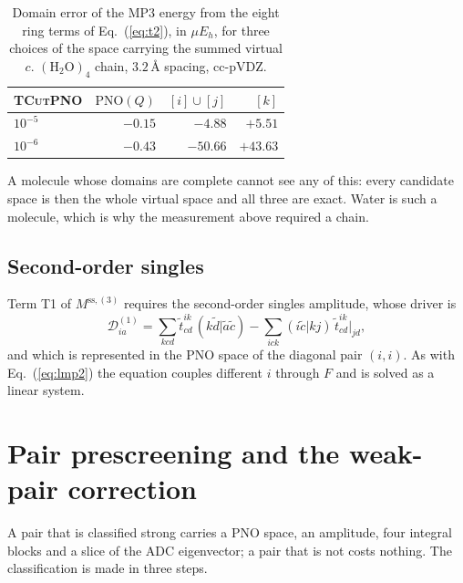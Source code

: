 \documentclass[aip,jcp,amsmath,amssymb,preprint,superscriptaddress]{revtex4-2}%
\newcommand{\pao}[1]{\tilde{#1}}
\newcommand{\TCut}[1]{\textsc{TCut#1}}
\begin{document}
\begin{table}
  \caption{Domain error of the MP3 energy from the eight ring terms of
    Eq.~(\ref{eq:t2}), in $\mu E_h$, for three choices of the space carrying
    the summed virtual $c$. $(\text{H}_2\text{O})_4$ chain,
    $3.2\,\text{\AA}$ spacing, cc-pVDZ.}
  \label{tab:ringspace}
  \begin{tabular}{lrrr}
    \hline\hline
    \TCut{PNO} & $\mathrm{PNO}(Q)$ & $[i]\cup[j]$ & $[k]$ \\
    \hline
    $10^{-5}$ & $-0.15$ & $-4.88$  & $+5.51$  \\
    $10^{-6}$ & $-0.43$ & $-50.66$ & $+43.63$ \\
    \hline\hline
  \end{tabular}
\end{table}

A molecule whose domains are complete cannot see any of this: every candidate
space is then the whole virtual space and all three are exact. Water is such a
molecule, which is why the measurement above required a chain.

\subsection{Second-order singles}

Term T1 of $M^{\text{ss},(3)}$ requires the second-order singles amplitude,
whose driver is
%
\begin{equation}
  \mathcal{D}^{(1)}_{ia} = \sum_{kcd}\tilde{t}^{ik}_{cd}\,(k\pao{d}|\pao{a}\pao{c})
    - \sum_{ick}(i\pao{c}|kj)\,\tilde{t}^{ik}_{cd}\Big|_{jd},
  \label{eq:t1drv}
\end{equation}
%
and which is represented in the PNO space of the diagonal pair $(i,i)$. As
with Eq.~(\ref{eq:lmp2}) the equation couples different $i$ through $F$ and is
solved as a linear system.

\section{Pair prescreening and the weak-pair correction}
\label{sec:screening}

A pair that is classified strong carries a PNO space, an amplitude, four
integral blocks and a slice of the ADC eigenvector; a pair that is not costs
nothing. The classification is made in three steps.
\end{document}
